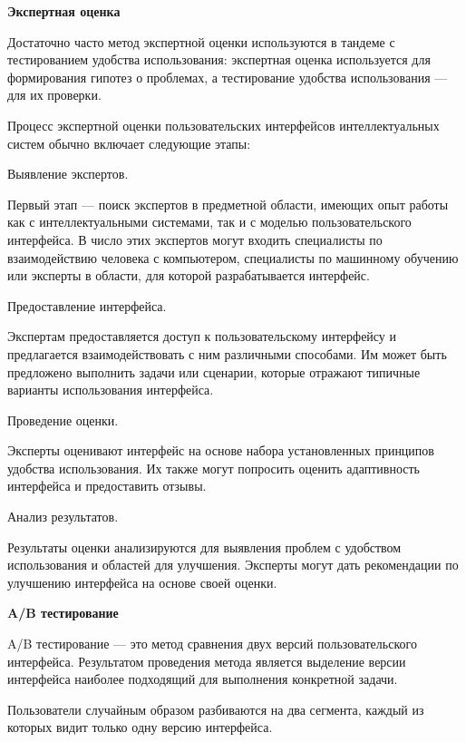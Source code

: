 \textbf{Экспертная оценка} 

Достаточно часто метод экспертной оценки используются в тандеме с тестированием удобства использования: экспертная оценка используется для формирования гипотез о проблемах, а тестирование удобства использования — для их проверки.

Процесс экспертной оценки пользовательских интерфейсов интеллектуальных систем обычно включает следующие этапы:

\begin{textitemize}
\item Выявление экспертов. 

Первый этап — поиск экспертов в предметной области, имеющих опыт работы как с интеллектуальными системами, так и с моделью пользовательского интерфейса. В число этих экспертов могут входить специалисты по взаимодействию человека с компьютером, специалисты по машинному обучению или эксперты в области, для которой разрабатывается интерфейс.

\item Предоставление интерфейса. 

Экспертам предоставляется доступ к пользовательскому интерфейсу и предлагается взаимодействовать с ним различными способами. Им может быть предложено выполнить задачи или сценарии, которые отражают типичные варианты использования интерфейса.

\item Проведение оценки. 

Эксперты оценивают интерфейс на основе набора установленных принципов удобства использования. Их также могут попросить оценить адаптивность интерфейса и предоставить отзывы.

\item Анализ результатов. 

Результаты оценки анализируются для выявления проблем с удобством использования и областей для улучшения. Эксперты могут дать рекомендации по улучшению интерфейса на основе своей оценки.
\end{textitemize}


\textbf{A/B тестирование}

A/B тестирование — это метод сравнения двух версий пользовательского интерфейса. Результатом проведения метода является выделение версии интерфейса наиболее подходящий для выполнения конкретной задачи.

Пользователи случайным образом разбиваются на два сегмента, каждый из которых видит только одну версию интерфейса.

